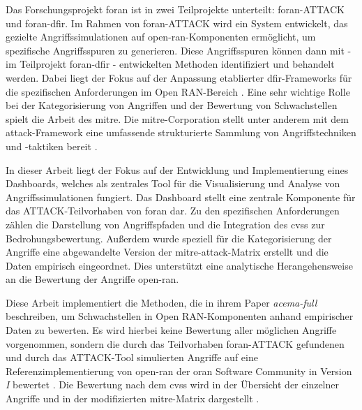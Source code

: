 \par Das Forschungsprojekt \gls{foran} ist in zwei Teilprojekte unterteilt: \gls{foran}-ATTACK und \gls{foran}-\gls{dfir}. Im Rahmen von \gls{foran}-ATTACK wird ein System entwickelt, das gezielte Angriffssimulationen auf \gls{open-ran}-Komponenten ermöglicht, um spezifische Angriffsspuren zu generieren. Diese Angriffsspuren können dann mit - im Teilprojekt \gls{foran}-\gls{dfir} - entwickelten Methoden identifiziert und behandelt werden. Dabei liegt der Fokus auf der Anpassung etablierter \gls{dfir}-Frameworks für die spezifischen Anforderungen im Open RAN-Bereich \autocite{5GFORAN}. Eine sehr wichtige Rolle bei der Kategorisierung von Angriffen und der Bewertung von Schwachstellen spielt die Arbeit des \gls{mitre}. Die \gls{mitre}-Corporation stellt unter anderem mit dem \gls{attack}-Framework eine umfassende strukturierte Sammlung von Angriffstechniken und -taktiken bereit \autocite{MITREATTCK} \autocite{SolvingProblemsSafer2024}.
\par
In dieser Arbeit liegt der Fokus auf der Entwicklung und Implementierung eines Dashboards, welches als zentrales Tool für die Visualisierung und Analyse von Angriffssimulationen fungiert. Das Dashboard stellt eine zentrale Komponente für das ATTACK-Teilvorhaben von \gls{foran} dar. Zu den spezifischen Anforderungen zählen die Darstellung von Angriffspfaden und die Integration des \gls{cvss} zur Bedrohungsbewertung. Außerdem wurde speziell für die Kategorisierung der Angriffe eine abgewandelte Version der \gls{mitre}-\gls{attack}-Matrix erstellt und die Daten empirisch eingeordnet. Dies unterstützt eine analytische Herangehensweise an die Bewertung der Angriffe \gls{open-ran}\autocite{dieterichDevelopmentAdversarySimulation}.
\par
Diese Arbeit implementiert die Methoden, die \citeauthor{klementSecuring6GTransition2024} in ihrem Paper \textit{\gls{acema-full}} beschreiben, um Schwachstellen in Open RAN-Komponenten anhand empirischer Daten zu bewerten. Es wird hierbei keine Bewertung aller möglichen Angriffe vorgenommen, sondern die durch das Teilvorhaben \gls{foran}-ATTACK gefundenen und durch das ATTACK-Tool simulierten Angriffe auf eine Referenzimplementierung von \gls{open-ran} der \gls{oran} Software Community in Version \textit{I} bewertet . Die Bewertung nach dem \gls{cvss} wird in der Übersicht der einzelner Angriffe und in der modifizierten \gls{mitre}-Matrix dargestellt \autocite{dieterichDevelopmentAdversarySimulation,klementSecuring6GTransition2024}.
